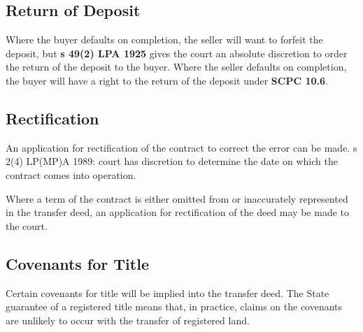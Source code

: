 \documentclass[
]{article}
\begin{document}
\hypertarget{return-of-deposit}{%
\subsection{Return of Deposit}\label{return-of-deposit}}

Where the buyer defaults on completion, the seller will want to forfeit
the deposit, but \textbf{s 49(2) LPA 1925} gives the court an absolute
discretion to order the return of the deposit to the buyer. Where the
seller defaults on completion, the buyer will have a right to the return
of the deposit under \textbf{SCPC 10.6}.

\hypertarget{rectification}{%
\subsection{Rectification}\label{rectification}}

An application for rectification of the contract to correct the error
can be made. s 2(4) LP(MP)A 1989: court has discretion to determine the
date on which the contract comes into operation.

Where a term of the contract is either omitted from or inaccurately
represented in the transfer deed, an application for rectification of
the deed may be made to the court.

\hypertarget{covenants-for-title}{%
\subsection{Covenants for Title}\label{covenants-for-title}}

Certain covenants for title will be implied into the transfer deed. The
State guarantee of a registered title means that, in practice, claims on
the covenants are unlikely to occur with the transfer of registered
land.
\end{document}
